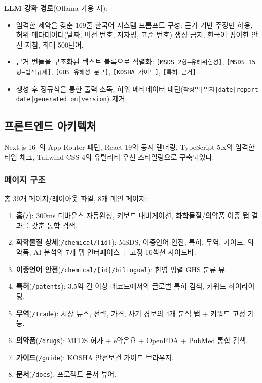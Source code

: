 \documentclass[preprint,12pt]{elsarticle}
\begin{document}
\textbf{LLM 강화 경로}(Ollama 가용 시):
\begin{itemize}
  \item 엄격한 제약을 갖춘 169줄 한국어 시스템 프롬프트 구성: 근거 기반 주장만 허용, 허위 메타데이터(날짜, 버전 번호, 저자명, 표준 번호) 생성 금지, 한국어 평이한 안전 지침, 최대 500단어.
  \item 근거 번들을 구조화된 텍스트 블록으로 직렬화: \texttt{[MSDS 2항---유해위험성]}, \texttt{[MSDS 15항---법적규제]}, \texttt{[GHS 유해성 문구]}, \texttt{[KOSHA 가이드]}, \texttt{[특허 근거]}.
  \item 생성 후 정규식을 통한 출력 소독: 허위 메타데이터 패턴(\texttt{작성일|일자|date|report date|generated on|version}) 제거.
\end{itemize}

\subsection{프론트엔드 아키텍처}
\label{sec:frontend}

Next.js 16~\cite{nextjs}의 App Router 패턴, React 19의 동시 렌더링, TypeScript 5.x의 엄격한 타입 체크, Tailwind CSS 4의 유틸리티 우선 스타일링으로 구축되었다.

\subsubsection{페이지 구조}

총 39개 페이지/레이아웃 파일, 8개 메인 페이지:

\begin{enumerate}
  \item \textbf{홈}(\texttt{/}): 300ms 디바운스 자동완성, 키보드 내비게이션, 화학물질/의약품 이중 탭 결과를 갖춘 통합 검색.
  \item \textbf{화학물질 상세}(\texttt{/chemical/[id]}): MSDS, 이중언어 안전, 특허, 무역, 가이드, 의약품, AI 분석의 7개 탭 인터페이스 + 고정 16섹션 사이드바.
  \item \textbf{이중언어 안전}(\texttt{/chemical/[id]/bilingual}): 한영 병렬 GHS 분류 뷰.
  \item \textbf{특허}(\texttt{/patents}): 3.5억 건 이상 레코드에서의 글로벌 특허 검색, 키워드 하이라이팅.
  \item \textbf{무역}(\texttt{/trade}): 시장 뉴스, 전략, 가격, 사기 경보의 4개 분석 탭 + 키워드 고정 기능.
  \item \textbf{의약품}(\texttt{/drugs}): MFDS 허가 + e약은요 + OpenFDA + PubMed 통합 검색.
  \item \textbf{가이드}(\texttt{/guide}): KOSHA 안전보건 가이드 브라우저.
  \item \textbf{문서}(\texttt{/docs}): 프로젝트 문서 뷰어.
\end{enumerate}
\end{document}
